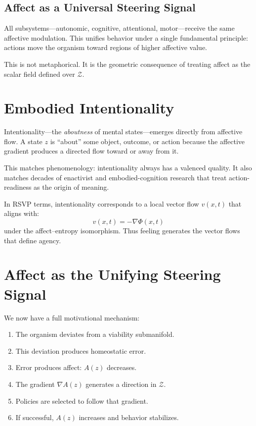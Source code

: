 \documentclass[12pt,oneside]{book}
\theoremstyle{plain}
\theoremstyle{definition}
\def\mathbf#1{#1}%
\begin{document}
\subsection{Affect as a Universal Steering Signal}

All subsystems—autonomic, cognitive, attentional, motor—receive the same
affective modulation.
This unifies behavior under a single fundamental principle:
actions move the organism toward regions of higher affective value.

This is not metaphorical.
It is the geometric consequence of treating affect as the scalar field
defined over $\mathcal{Z}$.

\section{Embodied Intentionality}

Intentionality—the \emph{aboutness} of mental states—emerges directly from
affective flow.
A state $z$ is ``about'' some object, outcome, or action because the
affective gradient produces a directed flow toward or away from it.

This matches phenomenology:
intentionality always has a valenced quality.
It also matches decades of enactivist and embodied-cognition research
that treat action-readiness as the origin of meaning.

In RSVP terms, intentionality corresponds to a
local vector flow $\mathbf{v}(x,t)$ that aligns with:
\[
\mathbf{v}(x,t) = -\nabla \Phi(x,t)
\]
under the affect–entropy isomorphism.
Thus feeling generates the vector flows that define agency.

\section{Affect as the Unifying Steering Signal}

We now have a full motivational mechanism:

\begin{enumerate}
    \item The organism deviates from a viability submanifold.
    \item This deviation produces homeostatic error.
    \item Error produces affect: $A(z)$ decreases.
    \item The gradient $\nabla A(z)$ generates a direction in $\mathcal{Z}$.
    \item Policies are selected to follow that gradient.
    \item If successful, $A(z)$ increases and behavior stabilizes.
\end{enumerate}
\end{document}
